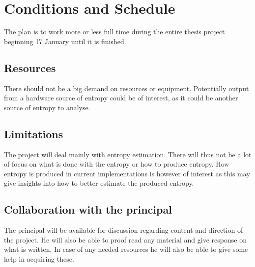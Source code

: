 \documentclass[a4paper,11pt]{report}
\begin{document}
\section*{Conditions and Schedule}
The plan is to work more or less full time during the entire thesis project
beginning 17 January until it is finished.
\subsection*{Resources}
There should not be a big demand on resources or equipment.
Potentially output from a hardware source of entropy could be of interest,
as it could be another source of entropy to analyse.
\subsection*{Limitations}
The project will deal mainly with entropy estimation. There will thus not be a
lot of focus on what is done with the entropy or how to produce entropy. How 
entropy is produced in current implementations is however of interest as this 
may give insights into how to better estimate the produced entropy. 
\subsection*{Collaboration with the principal}
The principal will be available for discussion regarding content and direction
of the project. He will also be able to proof read any material and give 
response on what is written. In case of any needed resources he will also be 
able to give some help in acquiring these.
\end{document}
